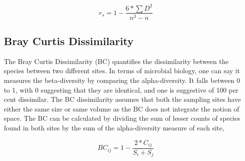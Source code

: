 $$r_{s} = 1 - \frac{6 * \sum D^{2}}{n^{3} - n}$$

\subsection{Bray Curtis Dissimilarity}
The Bray Curtis Dissimilarity (BC) quantifies the dissimilarity between the species between two different sites. In terms of microbial biology, one can say it measures the beta-diversity by comparing the alpha-diversity. It falls between 0 to 1, with 0 suggesting that they are identical, and one is suggestive of 100 per cent dissimilar. The BC dissimilarity assumes that both the sampling sites have either the same size or same volume as the BC does not integrate the notion of space. The BC can be calculated by dividing the sum of lesser counts of species found in both sites by the sum of the alpha-diversity measure of each site,

$$BC_{ij} = 1 - \frac{2 * C_{ij}}{S_{i} + S_{j}}$$